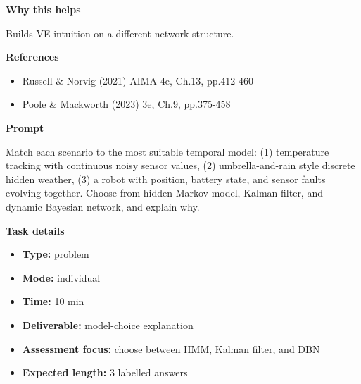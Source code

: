 \documentclass[11pt]{article}
\begin{document}
\begin{tcolorbox}[colback=white,colframe=MidnightBlue,title={Q4 Variable Elimination and Complexity},fonttitle=\bfseries,breakable]
{\large\bfseries\color{MidnightBlue} Why this helps}\par\medskip
Builds VE intuition on a different network structure.

{\large\bfseries\color{MidnightBlue} References}\par\medskip
\begin{itemize}\item Russell \& Norvig (2021) AIMA 4e, Ch.13, pp.412-460
\item Poole \& Mackworth (2023) 3e, Ch.9, pp.375-458\end{itemize}
\end{tcolorbox}

\begin{tcolorbox}[colback=white,colframe=MidnightBlue,title={Q5 Temporal Model Choice},fonttitle=\bfseries,breakable]
\begin{center}
\end{center}

{\large\bfseries\color{MidnightBlue} Prompt}\par\medskip
Match each scenario to the most suitable temporal model: (1) temperature tracking with continuous noisy sensor values, (2) umbrella-and-rain style discrete hidden weather, (3) a robot with position, battery state, and sensor faults evolving together. Choose from hidden Markov model, Kalman filter, and dynamic Bayesian network, and explain why.

{\large\bfseries\color{MidnightBlue} Task details}\par\medskip
\begin{itemize}\item \textbf{Type:} problem
\item \textbf{Mode:} individual
\item \textbf{Time:} 10 min
\item \textbf{Deliverable:} model-choice explanation
\item \textbf{Assessment focus:} choose between HMM, Kalman filter, and DBN
\item \textbf{Expected length:} 3 labelled answers\end{itemize}


\end{tcolorbox}
\end{document}
